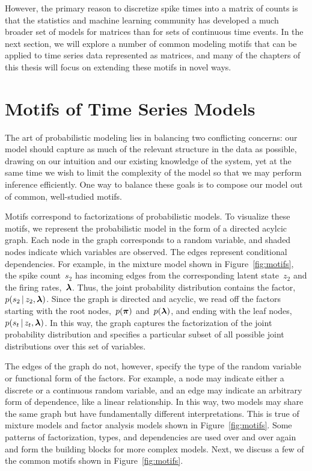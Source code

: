 However, the primary reason to discretize spike times into a matrix of
counts is that the statistics and machine learning community has
developed a much broader set of models for matrices than for sets of
continuous time events.  In the next section, we will explore a number
of common modeling motifs that can be applied to time series data
represented as matrices, and many of the chapters of this thesis will
focus on extending these motifs in novel ways.


\section{Motifs of Time Series Models}
\label{sec:motifs}
The art of probabilistic modeling lies in balancing two conflicting
concerns: our model should capture as much of the relevant structure
in the data as possible, drawing on our intuition and our existing
knowledge of the system, yet at the same time we wish to limit the
complexity of the model so that we may perform inference
efficiently. One way to balance these goals is to compose our model
out of common, well-studied motifs.

Motifs correspond to factorizations of probabilistic models.  To
visualize these motifs, we represent the probabilistic model in the
form of a directed acylcic graph. Each node in the graph corresponds
to a random variable, and shaded nodes indicate which variables are
observed. The edges represent conditional dependencies. For example,
in the mixture model shown in Figure~\ref{fig:motifs}, the spike
count~$s_2$ has incoming edges from the corresponding latent
state~$z_2$ and the firing rates,~$\boldsymbol{\lambda}$.  Thus, the joint
probability distribution contains the factor,~$p(s_2 \,|\, z_2,
\boldsymbol{\lambda})$. Since the graph is directed and acyclic, we read off
the factors starting with the root nodes,~$p(\boldsymbol{\pi})$ and~$p(\boldsymbol{\lambda})$,
and ending with the leaf nodes, ~$p(s_t \,|\, z_t, \boldsymbol{\lambda})$. In
this way, the graph captures the factorization of the joint
probability distribution and specifies a particular subset of all
possible joint distributions over this set of variables.

The edges of the graph do not, however, specify the type of the random
variable or functional form of the factors. For example, a node may
indicate either a discrete or a continuous random variable, and an
edge may indicate an arbitrary form of dependence, like a linear 
relationship.
In this way, two models may share the same graph but have
fundamentally different interpretations. This is true of mixture
models and factor analysis models shown in Figure~\ref{fig:motifs}.
Some patterns of factorization, types, and dependencies are used
over and over again and form the
building blocks for more complex models.
Next, we discuss a few of the common motifs shown in Figure~\ref{fig:motifs}.

